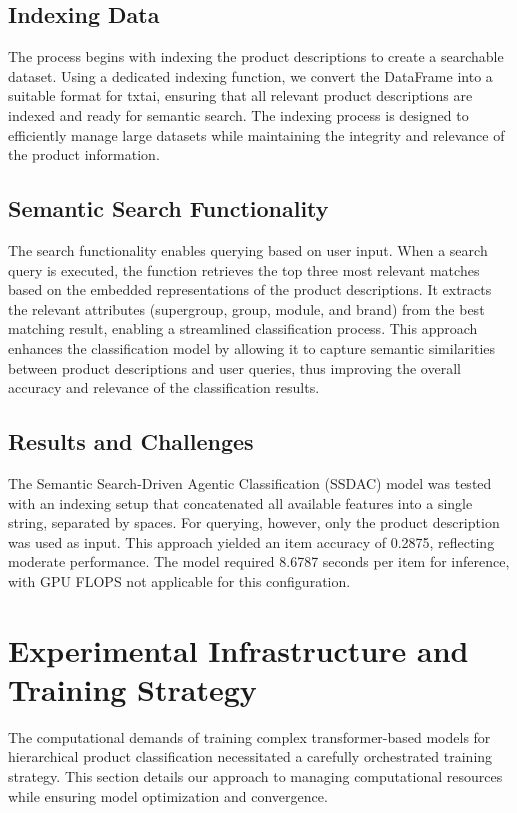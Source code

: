 \documentclass[9pt,a4paper,twoside]{rho-class/rho}
\begin{document}
    \subsection{Indexing Data}
    The process begins with indexing the product descriptions to create a searchable dataset. Using a dedicated indexing function, we convert the DataFrame into a suitable format for txtai, ensuring that all relevant product descriptions are indexed and ready for semantic search. The indexing process is designed to efficiently manage large datasets while maintaining the integrity and relevance of the product information.
    
    \subsection{Semantic Search Functionality}
    The search functionality enables querying based on user input. When a search query is executed, the function retrieves the top three most relevant matches based on the embedded representations of the product descriptions. It extracts the relevant attributes (supergroup, group, module, and brand) from the best matching result, enabling a streamlined classification process. This approach enhances the classification model by allowing it to capture semantic similarities between product descriptions and user queries, thus improving the overall accuracy and relevance of the classification results.
    
    \subsection{Results and Challenges}
    The Semantic Search-Driven Agentic Classification (SSDAC) model was tested with an indexing setup that concatenated all available features into a single string, separated by spaces. For querying, however, only the product description was used as input. This approach yielded an item accuracy of 0.2875, reflecting moderate performance. The model required 8.6787 seconds per item for inference, with GPU FLOPS not applicable for this configuration.
    

\section{Experimental Infrastructure and Training Strategy}

    The computational demands of training complex transformer-based models for hierarchical product classification necessitated a carefully orchestrated training strategy. This section details our approach to managing computational resources while ensuring model optimization and convergence.
    
\end{document}
